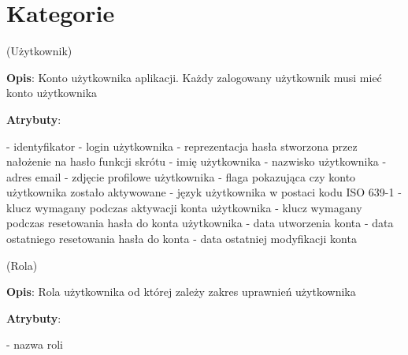 \section{Kategorie}\label{sec:categories}

\begin{enumerate}[label={\textbf{KAT/\protect\threedigits{\theenumi}}}, wide, labelwidth=!, labelindent=0pt, labelsep=0pt, series=reqs]
    \setlength\itemsep{1em}
     \label{kat:User} (Użytkownik)

    \textbf{Opis}: Konto użytkownika aplikacji. Każdy zalogowany użytkownik musi mieć konto użytkownika
    \par
    \textbf{Atrybuty}:
    \begin{itemize}[series=atr, wide, align=left, leftmargin=190pt]
         \label{kat:User:id} - identyfikator
         \label{kat:User:login} - login użytkownika
         \label{kat:User:passwordHash} - reprezentacja hasła stworzona przez nałożenie na hasło funkcji skrótu
         \label{kat:User:firstName} - imię użytkownika
         \label{kat:User:lastName} - nazwisko użytkownika
         \label{kat:User:email} - adres email
         \label{kat:User:image} - zdjęcie profilowe użytkownika
         \label{kat:User:activated} - flaga pokazująca czy konto użytkownika zostało aktywowane
         \label{kat:User:language} - język użytkownika w postaci kodu ISO 639-1
         \label{kat:User:activationKey} - klucz wymagany podczas aktywacji konta użytkownika
         \label{kat:User:resetKey} - klucz wymagany podczas resetowania hasła do konta użytkownika
         \label{kat:User:createdDate} - data utworzenia konta
         \label{kat:User:resetDate} - data ostatniego resetowania hasła do konta
         \label{kat:User:lastModifiedDate} - data ostatniej modyfikacji konta
    \end{itemize}

     \label{kat:Authority} (Rola)

    \textbf{Opis}: Rola użytkownika od której zależy zakres uprawnień użytkownika
    \par
    \textbf{Atrybuty}:
    \begin{itemize}[series=atr, wide, align=left, leftmargin=190pt]
         \label{kat:Authority:name} - nazwa roli
    \end{itemize}


\end{enumerate}
